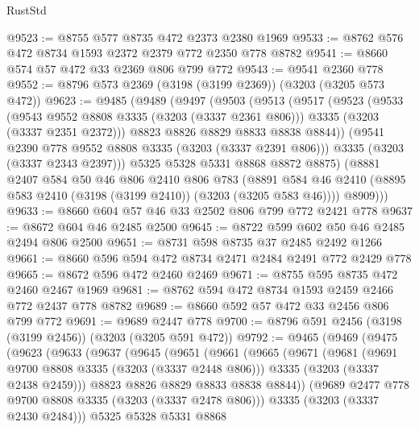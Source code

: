 \begin{lexlean}{RustStd}
\begin{coremodule}
{\begin{coremodule}
{{{{{{{{{{{{{{{@9523 := @8755 @577 @8735 @472 @2373 @2380 @1969
@9533 := @8762 @576 @472 @8734 @1593 @2372 @2379 @772 @2350 @778 @8782
@9541 := @8660 @574 @57 @472 @33 @2369 @806 @799 @772
@9543 := @9541 @2360 @778
@9552 := @8796 @573 @2369 (@3198 (@3199 @2369)) (@3203 (@3205 @573 @472))
@9623 := @9485
    (@9489
      (@9497
        (@9503
          (@9513
            (@9517
              (@9523
                (@9533
                  (@9543 @9552 @8808 @3335 (@3203 (@3337 @2361 @806)))
                  @3335
                  (@3203 (@3337 @2351 @2372)))
                @8823
                @8826
                @8829
                @8833
                @8838
                @8844))
            (@9541 @2390 @778 @9552 @8808 @3335 (@3203 (@3337 @2391 @806)))
            @3335
            (@3203 (@3337 @2343 @2397)))
          @5325
          @5328
          @5331
          @8868
          @8872
          @8875)
        (@8881
          @2407
          @584
          @50
          @46
          @806
          @2410
          @806
          @783
          (@8891 @584 @46 @2410 (@8895 @583 @2410 (@3198 (@3199 @2410)) (@3203 (@3205 @583 @46))))
          @8909)))
@9633 := @8660 @604 @57 @46 @33 @2502 @806 @799 @772 @2421 @778
@9637 := @8672 @604 @46 @2485 @2500
@9645 := @8722 @599 @602 @50 @46 @2485 @2494 @806 @2500
@9651 := @8731 @598 @8735 @37 @2485 @2492 @1266
@9661 := @8660 @596 @594 @472 @8734 @2471 @2484 @2491 @772 @2429 @778
@9665 := @8672 @596 @472 @2460 @2469
@9671 := @8755 @595 @8735 @472 @2460 @2467 @1969
@9681 := @8762 @594 @472 @8734 @1593 @2459 @2466 @772 @2437 @778 @8782
@9689 := @8660 @592 @57 @472 @33 @2456 @806 @799 @772
@9691 := @9689 @2447 @778
@9700 := @8796 @591 @2456 (@3198 (@3199 @2456)) (@3203 (@3205 @591 @472))
@9792 := @9465
    (@9469
      (@9475
        (@9623
          (@9633
            (@9637
              (@9645
                (@9651
                  (@9661
                    (@9665
                      (@9671
                        (@9681
                          (@9691 @9700 @8808 @3335 (@3203 (@3337 @2448 @806)))
                          @3335
                          (@3203 (@3337 @2438 @2459)))
                        @8823
                        @8826
                        @8829
                        @8833
                        @8838
                        @8844))
                    (@9689 @2477 @778 @9700 @8808 @3335 (@3203 (@3337 @2478 @806)))
                    @3335
                    (@3203 (@3337 @2430 @2484)))
                  @5325
                  @5328
                  @5331
                  @8868
}}}}}}}}}}}}}}}
\end{coremodule}}
\end{coremodule}
\end{lexlean}
